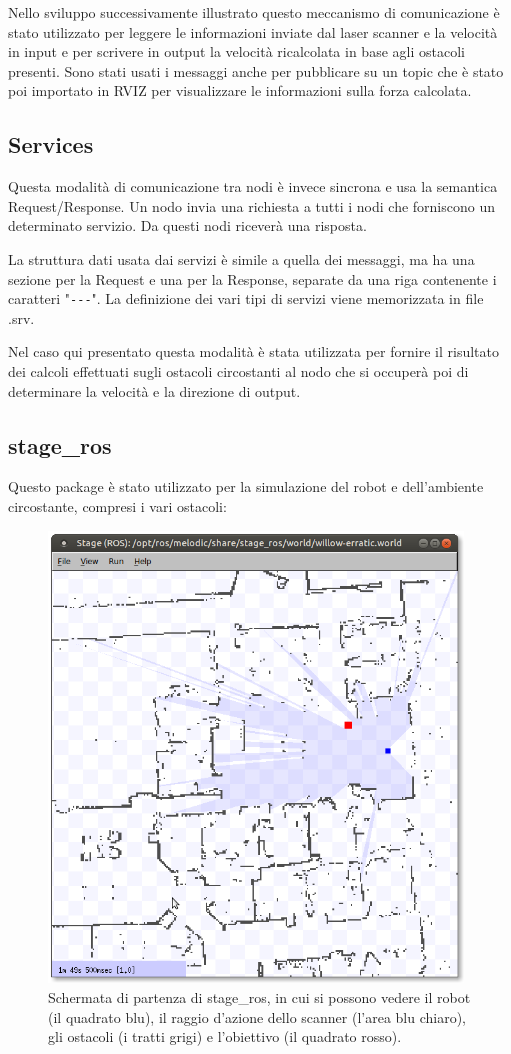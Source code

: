 \documentclass[Lau, binding=0.6cm, oneside]{sapthesis}
\begin{document}
Nello sviluppo successivamente illustrato questo meccanismo di comunicazione è stato utilizzato per leggere le informazioni inviate dal laser scanner e la velocità in input e per scrivere in output la velocità ricalcolata in base agli ostacoli presenti.
Sono stati usati i messaggi anche per pubblicare su un topic che è stato poi importato in RVIZ per visualizzare le informazioni sulla forza calcolata.

\subsection{Services}
Questa modalità di comunicazione tra nodi è invece sincrona e usa la semantica Request/Response.
Un nodo invia una richiesta a tutti i nodi che forniscono un determinato servizio.
Da questi nodi riceverà una risposta.

La struttura dati usata dai servizi è simile a quella dei messaggi, ma ha una sezione per la Request e una per la Response, separate da una riga contenente i caratteri "\lstinline{---}".
La definizione dei vari tipi di servizi viene memorizzata in file .srv.

Nel caso qui presentato questa modalità è stata utilizzata per fornire il risultato dei calcoli effettuati sugli ostacoli circostanti al nodo che si occuperà poi di determinare la velocità e la direzione di output.

\subsection{stage\_ros}
Questo package è stato utilizzato per la simulazione del robot e dell'ambiente circostante, compresi i vari ostacoli:

\begin{figure}[H]
    \centering
    \includegraphics[width=11cm]{stage_ros.png}
    \caption{Schermata di partenza di stage\_ros, in cui si possono vedere il robot (il quadrato blu), il raggio d'azione dello scanner (l'area blu chiaro), gli ostacoli (i tratti grigi) e l'obiettivo (il quadrato rosso).}
    \label{fig:stage_ros}
\end{figure}
\end{document}
